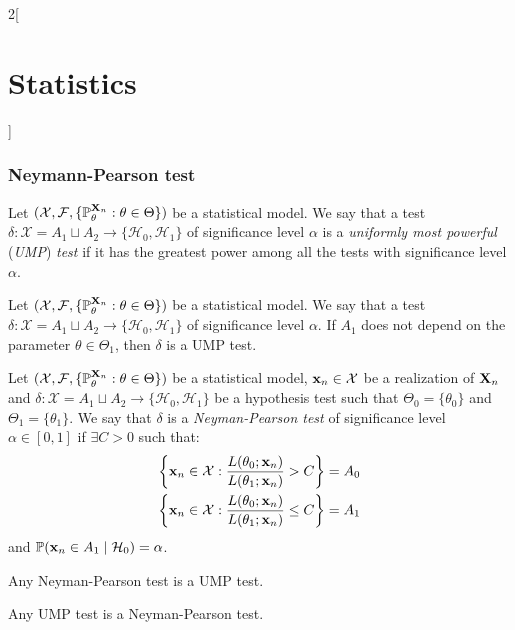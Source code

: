 \documentclass[../../../main_math.tex]{subfiles}
\begin{document}
\begin{multicols}{2}[\section{Statistics}]
  \subsubsection{Neymann-Pearson test}
  \begin{definition}
    Let $(\mathcal{X},\mathcal{F},\{\mathbb{P}_\theta^{\boldsymbol{\mathrm{X}}_n}:\theta\in\Theta\})$ be a statistical model. We say that a test $\delta:\mathcal{X}=A_1\sqcup A_2\rightarrow\{\mathcal{H}_0,\mathcal{H}_1\}$ of significance level $\alpha$ is a \emph{uniformly most powerful} (\emph{UMP}) \emph{test} if it has the greatest power among all the tests with significance level $\alpha$.
  \end{definition}
  \begin{lemma}
    Let $(\mathcal{X},\mathcal{F},\{\mathbb{P}_\theta^{\boldsymbol{\mathrm{X}}_n}:\theta\in\Theta\})$ be a statistical model. We say that a test $\delta:\mathcal{X}=A_1\sqcup A_2\rightarrow\{\mathcal{H}_0,\mathcal{H}_1\}$ of significance level $\alpha$. If $A_1$ does not depend on the parameter $\theta\in\Theta_1$, then $\delta$ is a UMP test.
  \end{lemma}
  \begin{definition}
    Let $(\mathcal{X},\mathcal{F},\{\mathbb{P}_\theta^{\boldsymbol{\mathrm{X}}_n}:\theta\in\Theta\})$ be a statistical model, $\boldsymbol{\mathrm{x}}_n\in\mathcal{X}$ be a realization of $\boldsymbol{\mathrm{X}}_n$ and $\delta:\mathcal{X}=A_1\sqcup A_2\rightarrow\{\mathcal{H}_0,\mathcal{H}_1\}$ be a hypothesis test such that $\Theta_0=\{\theta_0\}$ and $\Theta_1=\{\theta_1\}$. We say that $\delta$ is a \emph{Neyman-Pearson test} of significance level $\alpha\in[0,1]$ if $\exists C>0$ such that:
    \begin{gather*}
      \left\{\boldsymbol{\mathrm{x}}_n\in\mathcal{X}:\frac{L(\theta_0;\boldsymbol{\mathrm{x}}_n)}{L(\theta_1;\boldsymbol{\mathrm{x}}_n)}> C\right\}= A_0\\
      \left\{\boldsymbol{\mathrm{x}}_n\in\mathcal{X}:\frac{L(\theta_0;\boldsymbol{\mathrm{x}}_n)}{L(\theta_1;\boldsymbol{\mathrm{x}}_n)}\leq C\right\}= A_1
    \end{gather*}
    and $\mathbb{P}(\boldsymbol{\mathrm{x}}_n\in A_1\mid \mathcal{H}_0)=\alpha$.
  \end{definition}
  \begin{lemma}
    Any Neyman-Pearson test is a UMP test.
  \end{lemma}
  \begin{theorem}
    Any UMP test is a Neyman-Pearson test.
  \end{theorem}

\end{multicols}
\end{document}
